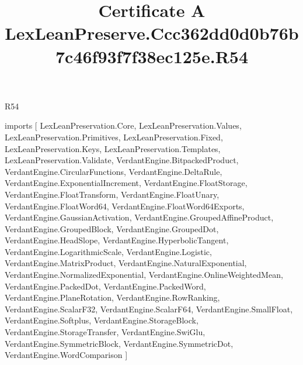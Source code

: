 \begin{lexlean}{R54}
\title{Certificate A LexLeanPreserve.Ccc362dd0d0b76b7c46f93f7f38ec125e.R54}
\begin{coremodule}
imports [
  LexLeanPreservation.Core,
  LexLeanPreservation.Values,
  LexLeanPreservation.Primitives,
  LexLeanPreservation.Fixed,
  LexLeanPreservation.Keys,
  LexLeanPreservation.Templates,
  LexLeanPreservation.Validate,
  VerdantEngine.BitpackedProduct,
  VerdantEngine.CircularFunctions,
  VerdantEngine.DeltaRule,
  VerdantEngine.ExponentialIncrement,
  VerdantEngine.FloatStorage,
  VerdantEngine.FloatTransform,
  VerdantEngine.FloatUnary,
  VerdantEngine.FloatWord64,
  VerdantEngine.FloatWord64Exports,
  VerdantEngine.GaussianActivation,
  VerdantEngine.GroupedAffineProduct,
  VerdantEngine.GroupedBlock,
  VerdantEngine.GroupedDot,
  VerdantEngine.HeadSlope,
  VerdantEngine.HyperbolicTangent,
  VerdantEngine.LogarithmicScale,
  VerdantEngine.Logistic,
  VerdantEngine.MatrixProduct,
  VerdantEngine.NaturalExponential,
  VerdantEngine.NormalizedExponential,
  VerdantEngine.OnlineWeightedMean,
  VerdantEngine.PackedDot,
  VerdantEngine.PackedWord,
  VerdantEngine.PlaneRotation,
  VerdantEngine.RowRanking,
  VerdantEngine.ScalarF32,
  VerdantEngine.ScalarF64,
  VerdantEngine.SmallFloat,
  VerdantEngine.Softplus,
  VerdantEngine.StorageBlock,
  VerdantEngine.StorageTransfer,
  VerdantEngine.SwiGlu,
  VerdantEngine.SymmetricBlock,
  VerdantEngine.SymmetricDot,
  VerdantEngine.WordComparison
]


\end{coremodule}
\end{lexlean}
